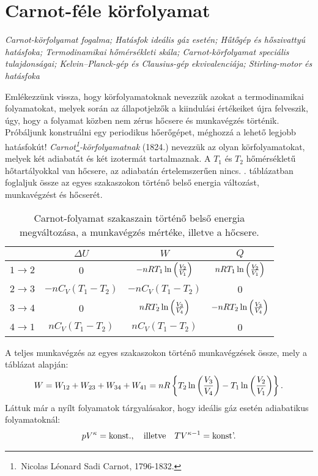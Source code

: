 \section{Carnot-féle körfolyamat}
\emph{Carnot-körfolyamat fogalma; Hatásfok ideális gáz esetén; Hűtőgép és hőszivattyú hatásfoka; Termodinamikai hőmérsékleti skála; Carnot-körfolyamat speciális tulajdonságai; Kelvin--Planck-gép és Clausius-gép ekvivalenciája; Stirling-motor és hatásfoka}

Emlékezzünk vissza, hogy körfolyamatoknak nevezzük azokat a termodinamikai folyamatokat, melyek során az állapotjelzők a kiindulási értékeiket újra felveszik, úgy, hogy a folyamat közben nem zérus hőcsere és munkavégzés történik. Próbáljunk konstruálni egy periodikus hőerőgépet, méghozzá a lehető legjobb hatásfokút! \emph{Carnot\footnote{\,Nicolas Léonard Sadi Carnot, 1796-1832.}-körfolyamatnak} (1824.) nevezzük az olyan körfolyamatokat, melyek két adiabatát és két izotermát tartalmaznak. A $T_1$ és $T_2$ hőmérsékletű hőtartályokkal van hőcsere, az adiabatán értelemszerűen nincs. . táblázatban foglaljuk össze az egyes szakaszokon történő belső energia változást, munkavégzést és hőcserét.
\begin{table}[h!]
\centering
\begin{tabular}{|c|c|c|c|} \cline{2-4}
\multicolumn{1}{c|}{} & $\Delta U$ & $W$ & $Q$\\ \hline\hline
$1\to 2$ & 0 & $-nRT_1\ln\left({\frac{V_2}{V_1}}\right)$ & $nRT_1\ln\left({\frac{V_2}{V_1}}\right)$ \\ \hline
$2\to 3$ & $-nC_V(T_1-T_2)$ & $-nC_V(T_1-T_2)$ & 0 \\ \hline
$3\to 4$ & 0 & $nRT_2\ln\left({\frac{V_3}{V_4}}\right)$ & $-nRT_2\ln\left({\frac{V_3}{V_4}}\right)$\\ \hline
$4\to 1$ & $nC_V(T_1-T_2)$ & $nC_V(T_1-T_2)$ & 0\\ \hline
\end{tabular}
\caption{Carnot-folyamat szakaszain történő belső energia megváltozása, a munkavégzés mértéke, illetve a hőcsere.}
\label{tab:Carnot}
\end{table}
A teljes munkavégzés az egyes szakaszokon történő munkavégzések össze, mely a táblázat alapján:
\begin{align}
	W = W_{12}+W_{23}+W_{34}+W_{41} = nR\left\{{T_2\ln\left({\frac{V_3}{V_4}}\right)-T_1\ln\left({\frac{V_2}{V_1}}\right)}\right\}.
\end{align}
Láttuk már a nyílt folyamatok tárgyalásakor, hogy ideális gáz esetén adiabatikus folyamatoknál:
\begin{align}
	pV^\kappa = \textnormal{konst.},\quad\textnormal{illetve}\quad TV^{\kappa-1}=\textnormal{konst'.}
\end{align} 
